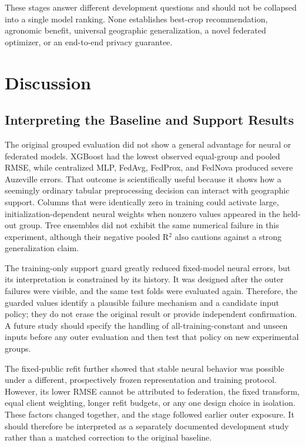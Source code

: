 \documentclass[journal]{IEEEtran}
\begin{document}
These stages answer different development questions and should not be collapsed
into a single model ranking. None establishes best-crop recommendation,
agronomic benefit, universal geographic generalization, a novel federated
optimizer, or an end-to-end privacy guarantee.

\section{Discussion}

\subsection{Interpreting the Baseline and Support Results}

The original grouped evaluation did not show a general advantage for neural or
federated models. XGBoost had the lowest observed equal-group and pooled RMSE,
while centralized MLP, FedAvg, FedProx, and FedNova produced severe Auzeville
errors. That outcome is scientifically useful because it shows how a seemingly
ordinary tabular preprocessing decision can interact with geographic support.
Columns that were identically zero in training could activate large,
initialization-dependent neural weights when nonzero values appeared in the
held-out group. Tree ensembles did not exhibit the same numerical failure in
this experiment, although their negative pooled R$^2$ also cautions against a
strong generalization claim.

The training-only support guard greatly reduced fixed-model neural errors, but
its interpretation is constrained by its history. It was designed after the
outer failures were visible, and the same test folds were evaluated again.
Therefore, the guarded values identify a plausible failure mechanism and a
candidate input policy; they do not erase the original result or provide
independent confirmation. A future study should specify the handling of
all-training-constant and unseen inputs before any outer evaluation and then
test that policy on new experimental groups.

The fixed-public refit further showed that stable neural behavior was possible
under a different, prospectively frozen representation and training protocol.
However, its lower RMSE cannot be attributed to federation, the fixed transform,
equal client weighting, longer refit budgets, or any one design choice in
isolation. These factors changed together, and the stage followed earlier outer
exposure. It should therefore be interpreted as a separately documented
development study rather than a matched correction to the original baseline.
\end{document}
